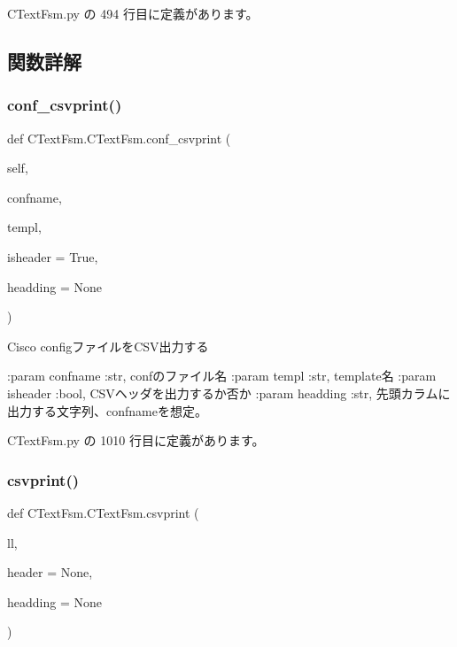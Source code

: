  C\+Text\+Fsm.\+py の 494 行目に定義があります。



\subsection{関数詳解}
\mbox{\label{classCTextFsm_1_1CTextFsm_a96df9cf7587763ba97a1c1299ff687e4}} 
\subsubsection{\texorpdfstring{conf\_csvprint()}{conf\_csvprint()}}
{\footnotesize\ttfamily def C\+Text\+Fsm.\+C\+Text\+Fsm.\+conf\+\_\+csvprint (\begin{DoxyParamCaption}\item[{}]{self,  }\item[{}]{confname,  }\item[{}]{templ,  }\item[{}]{isheader = {\ttfamily True},  }\item[{}]{headding = {\ttfamily None} }\end{DoxyParamCaption})}

\begin{DoxyVerb}Cisco configファイルをCSV出力する

:param confname :str,  confのファイル名
:param templ    :str,  template名
:param isheader :bool, CSVヘッダを出力するか否か
:param headding :str,  先頭カラムに出力する文字列、confnameを想定。
\end{DoxyVerb}
 

 C\+Text\+Fsm.\+py の 1010 行目に定義があります。

\mbox{\label{classCTextFsm_1_1CTextFsm_a06b5d47fdfe2bf0bd79ba735e941c343}} 
\subsubsection{\texorpdfstring{csvprint()}{csvprint()}}
{\footnotesize\ttfamily def C\+Text\+Fsm.\+C\+Text\+Fsm.\+csvprint (\begin{DoxyParamCaption}\item[{}]{ll,  }\item[{}]{header = {\ttfamily None},  }\item[{}]{headding = {\ttfamily None} }\end{DoxyParamCaption})\hspace{0.3cm}{\ttfamily [static]}}

